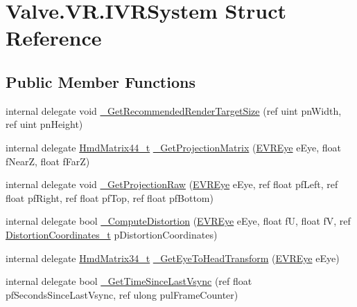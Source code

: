 \hypertarget{struct_valve_1_1_v_r_1_1_i_v_r_system}{}\section{Valve.\+V\+R.\+I\+V\+R\+System Struct Reference}
\label{struct_valve_1_1_v_r_1_1_i_v_r_system}
\subsection*{Public Member Functions}
\begin{DoxyCompactItemize}
\item 
internal delegate void \mbox{\hyperlink{struct_valve_1_1_v_r_1_1_i_v_r_system_a7c739552eda67112e5ed1c5e6b64388b}{\+\_\+\+Get\+Recommended\+Render\+Target\+Size}} (ref uint pn\+Width, ref uint pn\+Height)
\item 
internal delegate \mbox{\hyperlink{struct_valve_1_1_v_r_1_1_hmd_matrix44__t}{Hmd\+Matrix44\+\_\+t}} \mbox{\hyperlink{struct_valve_1_1_v_r_1_1_i_v_r_system_a10aad034ee13b75116d84a989eced445}{\+\_\+\+Get\+Projection\+Matrix}} (\mbox{\hyperlink{namespace_valve_1_1_v_r_a8153d4a3e627e1cede046327087c1880}{E\+V\+R\+Eye}} e\+Eye, float f\+NearZ, float f\+FarZ)
\item 
internal delegate void \mbox{\hyperlink{struct_valve_1_1_v_r_1_1_i_v_r_system_adb042a1d95520b0ab26f1f2c97d7dff4}{\+\_\+\+Get\+Projection\+Raw}} (\mbox{\hyperlink{namespace_valve_1_1_v_r_a8153d4a3e627e1cede046327087c1880}{E\+V\+R\+Eye}} e\+Eye, ref float pf\+Left, ref float pf\+Right, ref float pf\+Top, ref float pf\+Bottom)
\item 
internal delegate bool \mbox{\hyperlink{struct_valve_1_1_v_r_1_1_i_v_r_system_a88600e2b90cd94cb7fd918636a56cef3}{\+\_\+\+Compute\+Distortion}} (\mbox{\hyperlink{namespace_valve_1_1_v_r_a8153d4a3e627e1cede046327087c1880}{E\+V\+R\+Eye}} e\+Eye, float fU, float fV, ref \mbox{\hyperlink{struct_valve_1_1_v_r_1_1_distortion_coordinates__t}{Distortion\+Coordinates\+\_\+t}} p\+Distortion\+Coordinates)
\item 
internal delegate \mbox{\hyperlink{struct_valve_1_1_v_r_1_1_hmd_matrix34__t}{Hmd\+Matrix34\+\_\+t}} \mbox{\hyperlink{struct_valve_1_1_v_r_1_1_i_v_r_system_a285d2953403229712d9fa48bb3224d80}{\+\_\+\+Get\+Eye\+To\+Head\+Transform}} (\mbox{\hyperlink{namespace_valve_1_1_v_r_a8153d4a3e627e1cede046327087c1880}{E\+V\+R\+Eye}} e\+Eye)
\item 
internal delegate bool \mbox{\hyperlink{struct_valve_1_1_v_r_1_1_i_v_r_system_ab4843adda277e53c0307051b2ec21cc8}{\+\_\+\+Get\+Time\+Since\+Last\+Vsync}} (ref float pf\+Seconds\+Since\+Last\+Vsync, ref ulong pul\+Frame\+Counter)

\end{DoxyCompactItemize}
